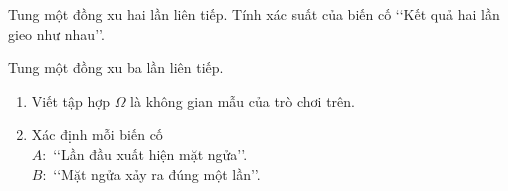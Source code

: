 \begin{bt}%
	Tung một đồng xu hai lần liên tiếp. Tính xác suất của biến cố \lq \lq Kết 
	quả hai lần gieo như nhau\rq \rq.
	
\end{bt}

\begin{bt}%
	Tung một đồng xu ba lần liên tiếp.
	\begin{enumerate}
		\item Viết tập hợp $ \Omega $ là không gian mẫu của trò chơi trên.
		\item Xác định mỗi biến cố \\
		$ A: $ \lq \lq Lần đầu xuất hiện mặt ngửa\rq \rq.\\
		$ B: $ \lq \lq Mặt ngửa xảy ra đúng một lần\rq \rq.
	\end{enumerate}
	
\end{bt}

